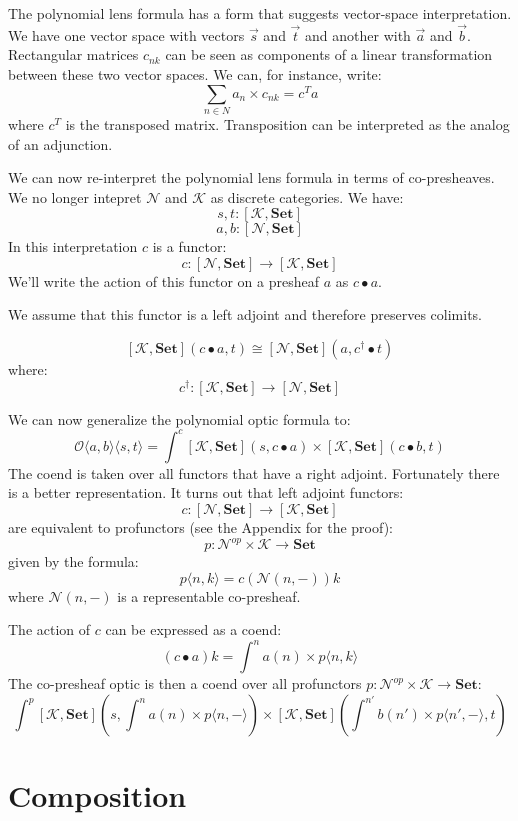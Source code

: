 \documentclass[11pt]{amsart}
\newcommand{\cat}[1]{\mathcal{#1}}%
\newcommand{\Cat}[1]{\mathbf{#1}}%
\newcommand{\Set}{\Cat{Set}}
\begin{document}
The polynomial lens formula has a form that suggests vector-space interpretation. We have one vector space with vectors $\vec{s}$ and $\vec{t}$ and another with $\vec{a}$ and $\vec{b}$. Rectangular matrices $c_{n k}$ can be seen as components of a linear transformation between these two vector spaces. We can, for instance, write:
\[  \sum_{n \in N} a_n \times c_{n k} = c^T a \]
where $c^T$ is the transposed matrix. Transposition can be interpreted as the analog of an adjunction. 

We can now re-interpret the polynomial lens formula in terms of co-presheaves. We no longer intepret $\cat N$ and $\cat K$ as discrete categories. We have:
\[ s, t \colon [\cat K, \Set] \]
\[a, b \colon [\cat N, \Set] \]
In this interpretation $c$ is a functor:
\[ c \colon [\cat N, \Set] \to [\cat K, \Set] \]
We'll write the action of this functor on a presheaf $a$ as $c \bullet a$.

We assume that this functor is a left adjoint and therefore preserves colimits. 

\[ [\cat K, \Set] (c \bullet a, t) \cong [\cat N, \Set] (a, c^{\dagger} \bullet t) \]
where:
\[ c^{\dagger} \colon [\cat K, \Set] \to [\cat N, \Set] \]

We can now generalize the polynomial optic formula to:
\[ \mathcal{O}\langle a, b\rangle \langle s, t \rangle = \int^{c} 
 [\cat K, \Set] \left(s,  c \bullet a \right) \times 
 [\cat K, \Set] \left(c \bullet b, t \right) \]
The coend is taken over all functors that have a right adjoint. Fortunately there is a better representation. It turns out that left adjoint functors:
\[ c \colon [\cat N, \Set] \to [\cat K, \Set] \]
are equivalent to profunctors (see the Appendix for the proof):
\[ p \colon \cat N^{op} \times \cat K \to \Set \]
given by the formula:
\[p \langle n, k \rangle = c ( \cat N(n, -)) k \]
where $\cat N(n, -)$ is a representable co-presheaf.

The action of $c$ can be expressed as a coend:
\[ (c \bullet a) k = \int^{n} a(n) \times p \langle n, k \rangle \]
The co-presheaf optic is then a coend over all profunctors $p \colon \cat N^{op} \times \cat K \to \Set$:
\[ \int^{p} 
 [\cat K, \Set] \left(s,  \int^{n} a(n) \times p \langle n, - \rangle \right) \times 
 [\cat K, \Set] \left(\int^{n'} b(n') \times p \langle n', - \rangle, t \right) \]
 
 \section{Composition}
\end{document}
